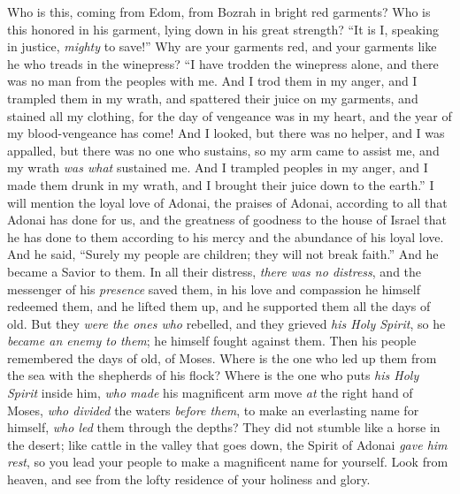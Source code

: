 \begin{biblechapter} %
 Who is this, coming from Edom, 
from Bozrah in bright red garments? 
Who is this honored in his garment, 
lying down in his great strength? 
“It is I, speaking in justice, 
\textit{mighty} to save!”
\verse Why are your garments red, 
and your garments like he who treads in the winepress?
\verse “I have trodden the winepress alone, 
and there was no man from the peoples with me. 
And I trod them in my anger, 
and I trampled them in my wrath, 
and spattered their juice on my garments, 
and stained all my clothing,
\verse for the day of vengeance was in my heart, 
and the year of my blood-vengeance has come!
\verse And I looked, but there was no helper, 
and I was appalled, but there was no one who sustains, 
so my arm came to assist me, 
and my wrath \textit{was what} sustained me.
\verse And I trampled peoples in my anger, 
and I made them drunk in my wrath, 
and I brought their juice down to the earth.”
 I will mention the loyal love of Adonai, the praises of Adonai, according to all that Adonai has done for us, 
and the greatness of goodness to the house of Israel that he has done to them according to his mercy and the abundance of his loyal love.
\verse And he said, “Surely my people are children; they will not break faith.” And he became a Savior to them.
\verse In all their distress, \textit{there was no distress}, 
and the messenger of his \textit{presence} saved them, 
in his love and compassion he himself redeemed them, 
and he lifted them up, 
and he supported them all the days of old.
\verse But they \textit{were the ones who} rebelled, 
and they grieved \textit{his Holy Spirit}, 
so he \textit{became an enemy to them}; 
he himself fought against them.
\verse Then his people remembered the days of old, of Moses. 
Where is the one who led up them from the sea with the shepherds of his flock? 
Where is the one who puts \textit{his Holy Spirit} inside him,
\verse \textit{who made} his magnificent arm move \textit{at} the right hand of Moses, 
\textit{who divided} the waters \textit{before them}, 
to make an everlasting name for himself,
\verse \textit{who led} them through the depths? 
They did not stumble like a horse in the desert;
\verse like cattle in the valley that goes down, the Spirit of Adonai \textit{gave him rest}, 
so you lead your people to make a magnificent name for yourself.
 Look from heaven, 
and see from the lofty residence of your holiness and glory. 

\end{biblechapter}
